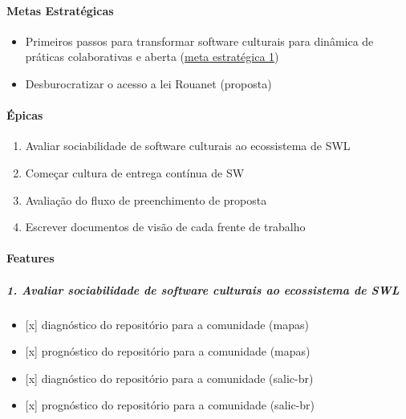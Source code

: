 \hypertarget{metas-estratuxe9gicas}{%
\paragraph{Metas Estratégicas}\label{metas-estratuxe9gicas}}

\begin{itemize}
\tightlist
\item
  Primeiros passos para transformar software culturais para dinâmica de
  práticas colaborativas e aberta
  (\href{https://github.com/lappis-unb/EcossistemasSWLivre/wiki/Metas\#meta-1-transforma\%C3\%A7\%C3\%A3o-de-software-legado-em-comunidades-de-software-aberto}{meta
  estratégica 1})
\item
  Desburocratizar o acesso a lei Rouanet (proposta)~
\end{itemize}

\hypertarget{uxe9picas}{%
\paragraph{Épicas}\label{uxe9picas}}

\begin{enumerate}
\def\labelenumi{\arabic{enumi}.}
\tightlist
\item
  Avaliar sociabilidade de software culturais ao ecossistema de SWL
\item
  Começar cultura de entrega contínua de SW
\item
  Avaliação do fluxo de preenchimento de proposta
\item
  Escrever documentos de visão de cada frente de trabalho
\end{enumerate}

\hypertarget{features}{%
\paragraph{Features}\label{features}}

\hypertarget{avaliar-sociabilidade-de-software-culturais-ao-ecossistema-de-swl}{%
\subparagraph{1. Avaliar sociabilidade de software culturais ao
ecossistema de
SWL}\label{avaliar-sociabilidade-de-software-culturais-ao-ecossistema-de-swl}}

\begin{itemize}
\tightlist
\item
  {[}x{]} diagnóstico do repositório para a comunidade (mapas)
\item
  {[}x{]} prognóstico do repositório para a comunidade (mapas)
\item
  {[}x{]} diagnóstico do repositório para a comunidade (salic-br)
\item
  {[}x{]} prognóstico do repositório para a comunidade (salic-br)
\end{itemize}

